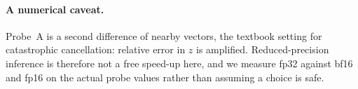 \paragraph{A numerical caveat.}
Probe~A is a second difference of nearby vectors, the textbook setting for
catastrophic cancellation: relative error in $z$ is amplified. Reduced-precision
inference is therefore not a free speed-up here, and we measure fp32 against
bf16 and fp16 on the actual probe values rather than assuming a choice is safe.
